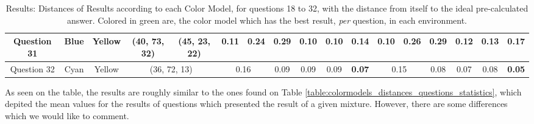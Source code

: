 \begin{table}[!htbp]
{\begin{tabular}{@{}cccccclccccclcccc@{}}
    \multicolumn{1}{c|}{Question 31} & \multicolumn{1}{c|}{Blue}    & \multicolumn{1}{c|}{Yellow}  & \multicolumn{1}{c||}{\cellcolor[HTML]{00FF80}(40, 73, 32)} & \multicolumn{1}{c||}{\cellcolor[HTML]{FF007F}(45, 23, 22)} & \multicolumn{1}{c|}{0.11}    & \multicolumn{1}{l|}{0.24}   & \multicolumn{1}{c|}{0.29}                                  & \multicolumn{1}{c|}{\cellcolor[HTML]{32CB00}\textbf{0.10}}                                  & \multicolumn{1}{c|}{\cellcolor[HTML]{32CB00}\textbf{0.10}}                                  & \multicolumn{1}{c||}{0.14}                                  & \multicolumn{1}{c|}{\cellcolor[HTML]{32CB00}\textbf{0.10}}    & \multicolumn{1}{l|}{0.26}   & \multicolumn{1}{c|}{0.29}                                  & \multicolumn{1}{c|}{0.12}                                  & \multicolumn{1}{c|}{0.13}                                  & \multicolumn{1}{c|}{0.17}                                  \\ \midrule
    \multicolumn{1}{c|}{Question 32} & \multicolumn{1}{c|}{Cyan}    & \multicolumn{1}{c|}{Yellow}  & \multicolumn{2}{c||}{\cellcolor[HTML]{00FF00}(36, 72, 13)}                                                             & \multicolumn{2}{c|}{0.16}                                  & \multicolumn{1}{c|}{0.09}                                  & \multicolumn{1}{c|}{0.09}                                  & \multicolumn{1}{c|}{0.09}                                  & \multicolumn{1}{c||}{\cellcolor[HTML]{32CB00}\textbf{0.07}} & \multicolumn{2}{c|}{0.15}                                  & \multicolumn{1}{c|}{0.08}                                  & \multicolumn{1}{c|}{0.07}                                  & \multicolumn{1}{c|}{0.08}                                  & \multicolumn{1}{c|}{\cellcolor[HTML]{32CB00}\textbf{0.05}} \\ \bottomrule
  \end{tabular}}
  \caption[Results: Distances of Results according to each Color Model, for questions 18 to 32.]{Results: Distances of Results according to each Color Model, for questions 18 to 32, with the distance from itself to the ideal pre-calculated answer. Colored
  in green are, the color model which has the best result, \emph{per} question, in each environment.}
  \label{table:expectation_distances_labonline}
\end{table}
%
As seen on the table, the results are roughly similar to the ones found on Table \ref{table:colormodels_distances_questions_statistics}, which depited the mean values for the results of questions which
presented the result of a given mixture. However, there are some differences which we would like to comment.
